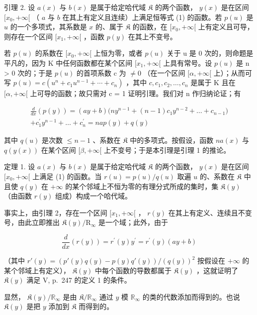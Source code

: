 引理 2. 设 \(a(x)\) 与 \(b(x)\) 是属于给定哈代域 \(\mathfrak{K}\) 的两个函数， \(y(x)\) 是在区间 \([x_0, +\infty[\) （ \(a\) 与 \(b\) 在其上有定义且连续）上满足恒等式 (1) 的函数。若 \(p(u)\) 是 \(u\) 的一个多项式，其系数是 \(x\) 的、属于 \(\mathfrak{K}\) 的函数，在 \([x_0, +\infty[\) 上有定义且可导，则存在一个区间 \([x_1, +\infty[\) ，函数 \(p(y)\) 在其上不变号。

若 \(p(u)\) 的系数在 \([x_{0}, +\infty[\) 上恒为零，或者 \(p(u)\) 关于 u 是 0 次的，则命题是平凡的，因为 K 中任何函数都在某个区间 \([x_{1}, +\infty[\) 上具有常号。设 \(p(u)\) 是 n \textgreater{} 0 次的；于是 \(p(u)\) 的首项系数 c 为 \(\neq 0\) （在一个区间 \([\alpha, +\infty[\) 上）；从而可写 \(p(u) = c(u^{n} + c_{1}u^{n-1} + \cdots + c_{n})\) ，其中 \(c, c_{1}, c_{2}, \ldots, c_{n}\) 是属于 K 且在 \([\alpha, +\infty[\) 上可导的函数；故只需对 c = 1 证明引理。我们对 n 作归纳论证；有

\[
\begin{array}{c} \frac {d}{d x} (p (y)) = (a y + b) \bigl (n y ^ {n - 1} + (n - 1) c _ {1} y ^ {n - 2} + \dots + c _ {n - 1} \bigr) \\ + c _ {1} ^ {\prime} y ^ {n - 1} + \dots + c _ {n} ^ {\prime} = n a p (y) + q (y) \end{array}
\]

其中 \(q(u)\) 是次数 \(\leqslant n - 1\) 、系数在 \(\mathfrak{K}\) 中的多项式。按假设，函数 \(na(x)\) 与 \(q(y(x))\) 在某个区间 \([\beta, +\infty[\) 上不变号；于是本引理是引理 1 的推论。

定理 1. 设 \(a(x)\) 与 \(b(x)\) 是属于给定哈代域 \(\mathfrak{K}\) 的两个函数， \(y(x)\) 是在区间 \([x_0, +\infty[\) 上满足 (1) 的函数。当 \(r(u) = p(u) / q(u)\) 取遍 \(u\) 的、系数在 \(\mathfrak{K}\) 中且使 \(q(y)\) 在 \(+\infty\) 的某个邻域上不恒为零的有理分式所成的集时，集 \(\mathfrak{K}(y)\) （由函数 \(r(y)\) 组成）构成一个哈代域。

事实上，由引理 2，存在一个区间 \([x_1, +\infty[\) ， \(r(y)\) 在其上有定义、连续且不变号，由此立即推出 \(\mathfrak{K}(y)/\mathrm{R}_{\infty}\) 是一个域；此外，由于

\[
\frac {d}{d x} (r (y)) = r ^ {\prime} (y) y ^ {\prime} = r ^ {\prime} (y) (a y + b)
\]

（其中 \(r'(y) = \left(p'(y)q(y) - p(y)q'(y)\right)/\left(q(y)\right)^2\) 按假设在 \(+\infty\) 的某个邻域上有定义）， \(\mathfrak{K}(y)\) 中每个函数的导数都属于 \(\mathfrak{K}(y)\) ，这就证明了 \(\mathfrak{K}(y)\) 满足 V, p.~247 的定义 1 的条件。

显然， \(\mathfrak{K}(y) / \mathbb{R}_{\infty}\) 是由 \(\mathfrak{K} / \mathbb{R}_{\infty}\) 通过 \(y\) 模 \(\mathbb{R}_{\infty}\) 的类的代数添加而得到的。也说 \(\mathfrak{K}(y)\) 是把 \(y\) 添加到 \(\mathfrak{K}\) 而得到的。

